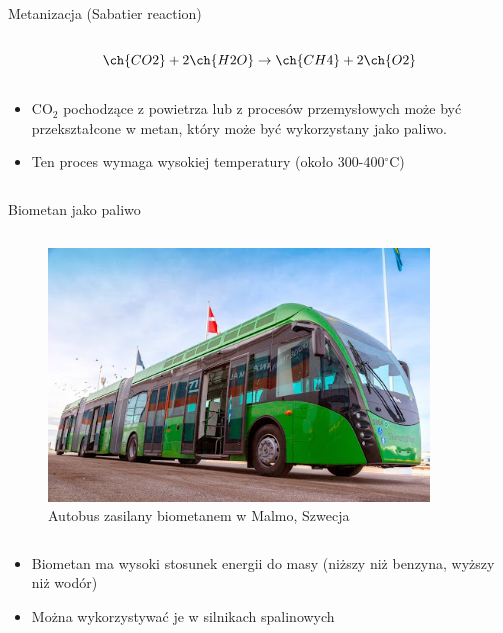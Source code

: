 \begin{columnframe}{Metanizacja (Sabatier reaction)}
    \begin{column}{0.5\textwidth}
        \[
            \ch{CO2} + 2\ch{H2O} \rightarrow \ch{CH4} + 2\ch{O2}
        \]
    \end{column}
    \begin{column}{0.5\textwidth}
        \begin{itemize}
            \item CO$_2$ pochodzące z powietrza lub z procesów przemysłowych może być przekształcone w metan, który może być wykorzystany jako paliwo.
            \item Ten proces wymaga wysokiej temperatury (około 300-400$^\circ$C)
        \end{itemize}
    \end{column}
\end{columnframe}

\begin{columnframe}{Biometan jako paliwo}
    \begin{column}{0.5\textwidth}
        \begin{figure}
            \centering
            \includegraphics[width=0.9\textwidth, frame]{images/Biomethane_bus_malmo.jpg}
            \caption{Autobus zasilany biometanem w Malmo, Szwecja}
        \end{figure}
    \end{column}
    \begin{column}{0.5\textwidth}
        \begin{itemize}
            \item Biometan ma wysoki stosunek energii do masy (niższy niż benzyna, wyższy niż wodór)
            \item Można wykorzystywać je w silnikach spalinowych
        \end{itemize}
    \end{column}
\end{columnframe}

